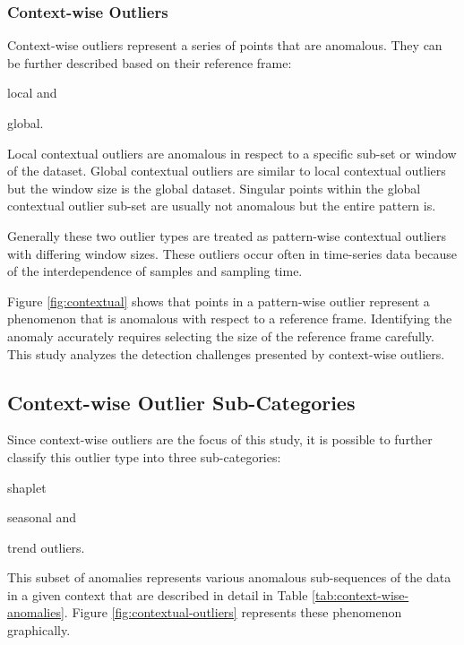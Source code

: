 \subsubsection{Context-wise Outliers}

Context-wise outliers represent a series of points that are anomalous. They can be further described based on their reference frame:
\begin{inlinelist}
    \item local and
    \item global.
\end{inlinelist}

Local contextual outliers are anomalous in respect to a specific sub-set or window of the dataset.
Global contextual outliers are similar to local contextual outliers but the window size is the global dataset.
Singular points within the global contextual outlier sub-set are usually not anomalous but the entire pattern is.

Generally these two outlier types are treated as pattern-wise contextual outliers with differing window sizes.
These outliers occur often in time-series data because of the interdependence of samples and sampling time.

Figure \ref{fig:contextual} shows that points in a pattern-wise outlier represent a phenomenon that is anomalous with respect to a reference frame.
Identifying the anomaly accurately requires selecting the size of the reference frame carefully.
This study analyzes the detection challenges presented by context-wise outliers.


\subsection{Context-wise Outlier Sub-Categories}

Since context-wise outliers are the focus of this study, it is possible to further classify this outlier type into three sub-categories:
\begin{inlinelist}
    \item shaplet
    \item seasonal and
    \item trend outliers.
\end{inlinelist}
This subset of anomalies represents various anomalous sub-sequences of the data in a given context that are described in detail in Table \ref{tab:context-wise-anomalies}. Figure \ref{fig:contextual-outliers} represents these phenomenon graphically.

